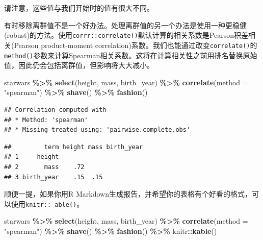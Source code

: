 \documentclass[
]{book}
\newenvironment{Shaded}{\begin{snugshade}}{\end{snugshade}}
\newcommand{\AttributeTok}[1]{\textcolor[rgb]{0.13,0.29,0.53}{#1}}
\newcommand{\FunctionTok}[1]{\textcolor[rgb]{0.13,0.29,0.53}{\textbf{#1}}}
\newcommand{\NormalTok}[1]{#1}
\newcommand{\SpecialCharTok}[1]{\textcolor[rgb]{0.81,0.36,0.00}{\textbf{#1}}}
\newcommand{\StringTok}[1]{\textcolor[rgb]{0.31,0.60,0.02}{#1}}
\begin{document}
请注意，这些值与我们开始时的值有很大不同。

有时移除离群值不是一个好办法。处理离群值的另一个办法是使用一种更稳健(robust)的方法。使用\texttt{corrr::correlate()}默认计算的相关系数是Pearson积差相关(Pearson product-moment correlation)系数。我们也能通过改变\texttt{correlate()}的\texttt{method()}参数来计算Spearman相关系数。这将在计算相关性之前用排名替换原始值，因此仍会包括离群值，但影响将大大减小。

\begin{Shaded}
\begin{Highlighting}[]
\NormalTok{starwars }\SpecialCharTok{\%\textgreater{}\%}
  \FunctionTok{select}\NormalTok{(height, mass, birth\_year) }\SpecialCharTok{\%\textgreater{}\%}
  \FunctionTok{correlate}\NormalTok{(}\AttributeTok{method =} \StringTok{"spearman"}\NormalTok{) }\SpecialCharTok{\%\textgreater{}\%}
  \FunctionTok{shave}\NormalTok{() }\SpecialCharTok{\%\textgreater{}\%}
  \FunctionTok{fashion}\NormalTok{()}
\end{Highlighting}
\end{Shaded}

\begin{verbatim}
## Correlation computed with
## * Method: 'spearman'
## * Missing treated using: 'pairwise.complete.obs'
\end{verbatim}

\begin{verbatim}
##         term height mass birth_year
## 1     height                       
## 2       mass    .72                
## 3 birth_year    .15  .15
\end{verbatim}

顺便一提，如果你用R Markdown生成报告，并希望你的表格有个好看的格式，可以使用\texttt{knitr::\ able()}。

\begin{Shaded}
\begin{Highlighting}[]
\NormalTok{starwars }\SpecialCharTok{\%\textgreater{}\%}
  \FunctionTok{select}\NormalTok{(height, mass, birth\_year) }\SpecialCharTok{\%\textgreater{}\%}
  \FunctionTok{correlate}\NormalTok{(}\AttributeTok{method =} \StringTok{"spearman"}\NormalTok{) }\SpecialCharTok{\%\textgreater{}\%}
  \FunctionTok{shave}\NormalTok{() }\SpecialCharTok{\%\textgreater{}\%}
  \FunctionTok{fashion}\NormalTok{() }\SpecialCharTok{\%\textgreater{}\%}
\NormalTok{  knitr}\SpecialCharTok{::}\FunctionTok{kable}\NormalTok{()}
\end{Highlighting}
\end{Shaded}
\end{document}
